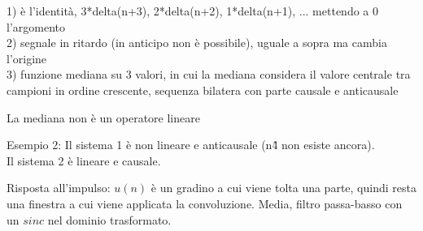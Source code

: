 1) è l'identità, 3*delta(n+3), 2*delta(n+2), 1*delta(n+1), ... mettendo a 0 l'argomento \\
2) segnale in ritardo (in anticipo non è possibile), uguale a sopra ma cambia l'origine \\
3) funzione mediana su 3 valori, in cui la mediana considera il valore centrale tra campioni in ordine crescente, sequenza bilatera con parte causale e anticausale

La mediana non è un operatore lineare


Esempio 2:
Il sistema 1 è non lineare e anticausale (n\^4 non esiste ancora). \\
Il sistema 2 è lineare e causale.


Risposta all'impulso: $u(n)$ è un gradino a cui viene tolta una parte, quindi resta una finestra a cui viene applicata la convoluzione. Media, filtro passa-basso con un $sinc$ nel dominio trasformato.




